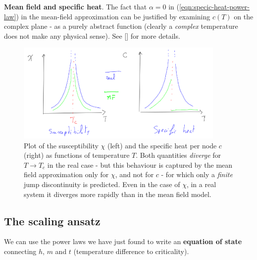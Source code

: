 \documentclass[../../main.tex]{subfiles}
\begin{document}
\begin{appr}\textbf{Mean field and specific heat}. The fact that $\alpha=0$ in (\ref{eqn:specic-heat-power-law}) in the mean-field approximation can be justified by examining $c(T)$ on the complex plane - as a purely abstract function (clearly a \textit{complex} temperature does not make any physical sense). See [] %
for more details.
\end{appr}

\begin{figure}[H]
    \centering
    \includegraphics[width=0.9\textwidth]{chi-cv.png}
    \caption{Plot of the susceptibility $\chi$ (left) and the specific heat per node $c$ (right) as functions of temperature $T$. Both quantities \textit{diverge} for $T \to T_c$ in the real case - but this behaviour is captured by the mean field approximation only for $\chi$, and not for $c$ - for which only a \textit{finite} jump discontinuity is predicted. Even in the case of $\chi$, in a real system it diverges more rapidly than in the mean field model.}
    \label{fig:chi-cv}
\end{figure}

\subsection{The scaling ansatz}
We can use the power laws we have just found to write an \textbf{equation of state} connecting $h$, $m$ and $t$ (temperature difference to criticality). 

\medskip
\end{document}

